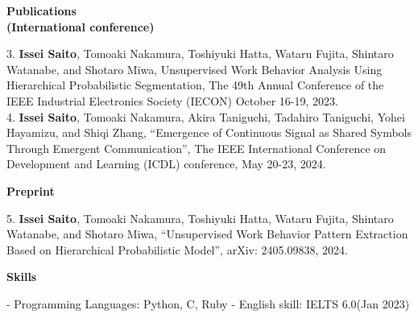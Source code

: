 \documentclass[a4paper,10pt]{article}
\begin{document}
\vspace{10pt}

\noindent
\begin{minipage}[t]{0.3\textwidth}
    \textbf{Publications \\(International conference)}
\end{minipage}%
\begin{minipage}[t]{0.7\textwidth}
    3. \textbf{Issei Saito}, Tomoaki Nakamura, Toshiyuki Hatta, Wataru Fujita, Shintaro Watanabe, and Shotaro Miwa, Unsupervised Work Behavior Analysis Using Hierarchical Probabilistic Segmentation, The 49th Annual Conference of the IEEE Industrial Electronics Society (IECON) October 16-19, 2023.  \newline \\
    4. \textbf{Issei Saito}, Tomoaki Nakamura, Akira Taniguchi, Tadahiro Taniguchi, Yohei Hayamizu, and Shiqi Zhang, “Emergence of Continuous Signal as Shared Symbols Through Emergent Communication”, The IEEE International Conference on Development and Learning (ICDL) conference, May 20-23, 2024.
\end{minipage}

\vspace{10pt}

\noindent
\begin{minipage}[t]{0.3\textwidth}
    \textbf{Preprint}
\end{minipage}%
\begin{minipage}[t]{0.7\textwidth}
    5. \textbf{Issei Saito}, Tomoaki Nakamura, Toshiyuki Hatta, Wataru Fujita, Shintaro Watanabe, and Shotaro Miwa, “Unsupervised Work Behavior Pattern Extraction Based on Hierarchical Probabilistic Model”, arXiv: 2405.09838, 2024.
\end{minipage}

\vspace{10pt}

\noindent
\begin{minipage}[t]{0.3\textwidth}
    \textbf{Skills}
\end{minipage}%
\begin{minipage}[t]{0.7\textwidth}
    - Programming Languages: Python, C, Ruby \newline
    - English skill: IELTS 6.0(Jan 2023)
\end{minipage}

\vspace{10pt}
\end{document}
